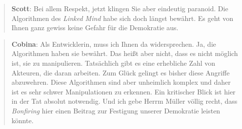 \documentclass{scrartcl}
\newenvironment{antworta}{
  \begin{quotation}
  }{
  \end{quotation}
}
\newenvironment{antwortb}{
  \begin{quotation}
  }{
  \end{quotation}
}
\newcommand{\name}[1]{\textbf{#1}}
\begin{document}
\begin{antwortb}
\name{Scott}: Bei allem Respekt, jetzt klingen Sie aber eindeutig
paranoid. Die Algorithmen des \emph{Linked Mind} habe sich doch
längst bewährt. Es geht von Ihnen ganz gewiss keine Gefahr
für die Demokratie aus.
\end{antwortb}


\begin{antworta}
\name{Cobina}: Als Entwicklerin, muss ich Ihnen da
widersprechen. Ja, die Algorithmen haben sie bewährt. Das
heißt aber nicht, dass es nicht möglich ist, sie zu
manipulieren. Tatsächlich gibt es eine erhebliche Zahl von
Akteuren, die daran arbeiten. Zum Glück gelingt es bisher
diese Angriffe abzuwehren. Diese Algorithmen sind aber
unheimlich komplex und daher ist es sehr schwer
Manipulationen zu erkennen. Ein kritischer Blick ist hier in
der Tat absolut notwendig. Und ich gebe Herrm Müller völlig
recht, dass \emph{Bonfiring} hier einen Beitrag zur Festigung
unserer Demokratie leisten könnte.
\end{antworta}
\end{document}
